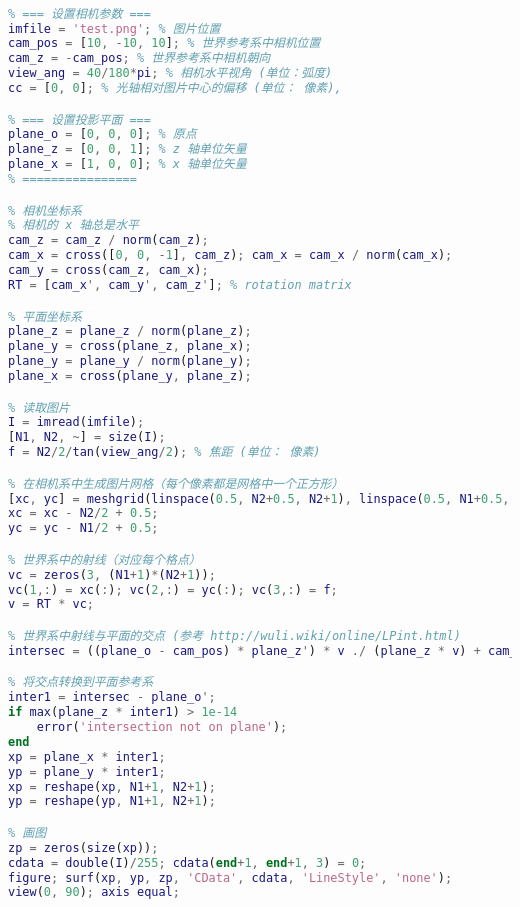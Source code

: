 \begin{lstlisting}[language=matlab, caption=art3D.m]
% 参数中矢量不必归一化

% === 设置相机参数 ===
imfile = 'test.png'; % 图片位置
cam_pos = [10, -10, 10]; % 世界参考系中相机位置
cam_z = -cam_pos; % 世界参考系中相机朝向
view_ang = 40/180*pi; % 相机水平视角 (单位：弧度)
cc = [0, 0]; % 光轴相对图片中心的偏移 (单位： 像素),

% === 设置投影平面 ===
plane_o = [0, 0, 0]; % 原点
plane_z = [0, 0, 1]; % z 轴单位矢量
plane_x = [1, 0, 0]; % x 轴单位矢量
% ================

% 相机坐标系
% 相机的 x 轴总是水平
cam_z = cam_z / norm(cam_z);
cam_x = cross([0, 0, -1], cam_z); cam_x = cam_x / norm(cam_x);
cam_y = cross(cam_z, cam_x);
RT = [cam_x', cam_y', cam_z']; % rotation matrix

% 平面坐标系
plane_z = plane_z / norm(plane_z);
plane_y = cross(plane_z, plane_x);
plane_y = plane_y / norm(plane_y);
plane_x = cross(plane_y, plane_z);

% 读取图片
I = imread(imfile);
[N1, N2, ~] = size(I);
f = N2/2/tan(view_ang/2); % 焦距 (单位： 像素)

% 在相机系中生成图片网格（每个像素都是网格中一个正方形）
[xc, yc] = meshgrid(linspace(0.5, N2+0.5, N2+1), linspace(0.5, N1+0.5, N1+1));
xc = xc - N2/2 + 0.5;
yc = yc - N1/2 + 0.5;

% 世界系中的射线（对应每个格点）
vc = zeros(3, (N1+1)*(N2+1));
vc(1,:) = xc(:); vc(2,:) = yc(:); vc(3,:) = f;
v = RT * vc;

% 世界系中射线与平面的交点 (参考 http://wuli.wiki/online/LPint.html)
intersec = ((plane_o - cam_pos) * plane_z') * v ./ (plane_z * v) + cam_pos';

% 将交点转换到平面参考系
inter1 = intersec - plane_o';
if max(plane_z * inter1) > 1e-14
    error('intersection not on plane');
end
xp = plane_x * inter1;
yp = plane_y * inter1;
xp = reshape(xp, N1+1, N2+1);
yp = reshape(yp, N1+1, N2+1);

% 画图
zp = zeros(size(xp));
cdata = double(I)/255; cdata(end+1, end+1, 3) = 0;
figure; surf(xp, yp, zp, 'CData', cdata, 'LineStyle', 'none');
view(0, 90); axis equal;
\end{lstlisting}

